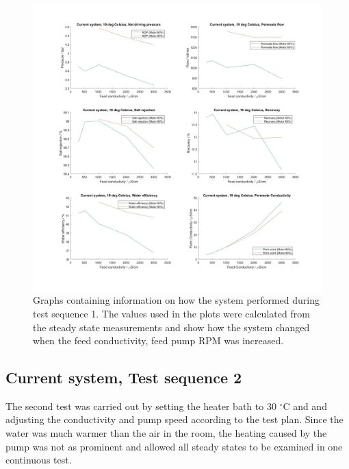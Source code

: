 \begin{figure}[H]
    \centering
    \includegraphics[width=1\textwidth]{Key20}
    \caption{Graphs containing information on how the system performed during test sequence 1. The values used in the plots were calculated from the steady state measurements and show how the system changed when the feed conductivity, feed pump RPM was increased.}
    \label{fig:K20}
\end{figure}

\newpage

\subsection{Current system, Test sequence 2}

The second test was carried out by setting the heater bath to 30 $^{\circ}$C and and adjusting the conductivity and pump speed according to the test plan. Since the water was much warmer than the air in the room, the heating caused by the pump was not as prominent and allowed all steady states to be examined in one continuous test. 


